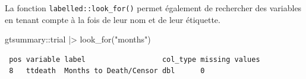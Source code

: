 \documentclass[
  letterpaper,
  DIV=11,
  numbers=noendperiod,
  oneside]{scrreprt}
\newenvironment{Shaded}{\begin{snugshade}}{\end{snugshade}}
\newcommand{\FunctionTok}[1]{\textcolor[rgb]{0.28,0.35,0.67}{#1}}
\newcommand{\NormalTok}[1]{\textcolor[rgb]{0.00,0.23,0.31}{#1}}
\newcommand{\SpecialCharTok}[1]{\textcolor[rgb]{0.37,0.37,0.37}{#1}}
\newcommand{\StringTok}[1]{\textcolor[rgb]{0.13,0.47,0.30}{#1}}
\begin{document}
La fonction \texttt{labelled::look\_for()} permet également de
rechercher des variables en tenant compte à la fois de leur nom et de
leur étiquette.

\begin{Shaded}
\begin{Highlighting}[]
\NormalTok{gtsummary}\SpecialCharTok{::}\NormalTok{trial }\SpecialCharTok{|\textgreater{}} 
  \FunctionTok{look\_for}\NormalTok{(}\StringTok{"months"}\NormalTok{)}
\end{Highlighting}
\end{Shaded}

\begin{verbatim}
 pos variable label                  col_type missing values
 8   ttdeath  Months to Death/Censor dbl      0             
\end{verbatim}
\end{document}
